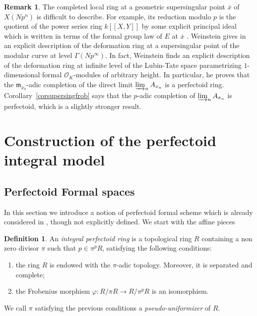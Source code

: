 \documentclass[JEP,XML,SOM,Unicode,published]{cedram}
\newenvironment{enumeratei}
{\bgroup\def\theenumi{\roman{enumi}}\def\theenumii{\arabic{enumii}}\begin{enumerate}}
{\end{enumerate}\egroup}
\newcommand{\lcr}{[\![}
\newcommand{\rcr}{]\!]}
\numberwithin{equation}{section}
\theoremstyle{definition}
\newtheorem{definition}[prop]{Definition}
\newtheorem{remark}[prop]{Remark}
\newcommand{\n}[1]{\mathcal{#1}}
\newcommand{\f}[1]{\mathfrak{#1}}
\begin{document}
\begin{remark}
The completed local ring at a geometric supersingular point $\overline{x}$ of $X(Np^n)$ is difficult to describe. For example, its reduction modulo $p$ is the quotient of the power series ring $k\lcr X,Y\rcr$ by some explicit principal ideal which is written in terms of the formal group law of $E$ at $\overline{x}$ \cite[Th.\,13.8.4]{katz1985arithmetic}. Weinstein gives in \cite{MR3529120} an explicit description of the deformation ring at a supersingular point of the modular curve at level $\Gamma(Np^\infty)$. In fact, Weinstein finds an explicit description of the deformation ring at infinite level of the Lubin-Tate space parametrizing $1$\nobreakdash-dimensional formal $\n{O}_K$-modules of arbitrary height. In particular, he proves that the $\f{m}_{x_0}$-adic completion of the direct limit $\varinjlim_n A_{x_n}$ is a perfectoid ring. Corollary~\ref{corsupersingfrob} says that the $p$-adic completion of $\varinjlim_{n} A_{x_n}$ is perfectoid, which is a slightly stronger result.
\end{remark}

\section{Construction of the perfectoid integral model}
\label{Proof Theorem}

\subsection*{Perfectoid Formal spaces}

In this section we introduce a notion of perfectoid formal scheme which is already considered in \cite[Lem.\,3.10]{MR3905467}, though not explicitly defined. We start with the affine pieces

\begin{definition}
An \textit{integral perfectoid ring} is a topological ring $R$ containing a non zero divisor $\pi$ such that $p\in \pi^p R$, satisfying the following conditions:
\begin{enumeratei}

\item
the ring $R$ is endowed with the $\pi$-adic topology. Moreover, it is separated and complete;

\item
the Frobenius morphism $\varphi: R/\pi R\to R/\pi^{p}R$ is an isomorphism.
\end{enumeratei}
We call $\pi$ satisfying the previous conditions a \textit{pseudo-uniformizer} of $R$.
\end{definition}
\end{document}
